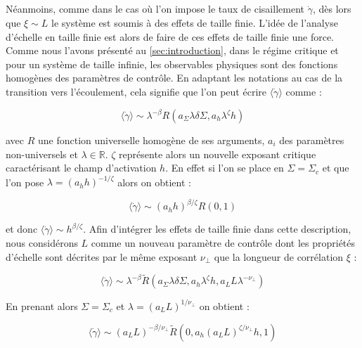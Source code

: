 \subparagraph{}Néanmoins, comme dans le cas où l'on impose le taux de cisaillement $\dot{\gamma}$, dès lors que $\xi \sim L$ le système est soumis à des effets de taille finie. L'idée de l'analyse d'échelle en taille finie est alors de faire de ces effets de taille finie une force. Comme nous l'avons présenté au \autoref{sec:introduction}, dans le régime critique et pour un système de taille infinie, les observables physiques sont des fonctions homogènes des paramètres de contrôle. En adaptant les notations au cas de la transition vers l'écoulement, cela signifie que l'on peut écrire $ \langle \dot{\gamma} \rangle$ comme :

\begin{equation}
\langle\dot{\gamma}\rangle \sim \lambda^{-\beta}R(a_\Sigma\lambda\delta\Sigma, a_h\lambda^\zeta h)
\end{equation}

\noindent avec $R$ une fonction universelle homogène de ses arguments, $a_i$ des paramètres non-universels et $\lambda \in \mathbb{R}$. $\zeta$ représente alors un nouvelle exposant critique caractérisant le champ d'activation $h$. En effet si l'on se place en $\Sigma = \Sigma_c$ et que l'on pose $\lambda=(a_h h)^{-1/\zeta}$ alors on obtient :

\begin{equation}
    \langle\dot{\gamma}\rangle \sim (a_h h)^{\beta/\zeta}R(0, 1)
\end{equation}

\noindent et donc $\langle\dot{\gamma}\rangle \sim  h^{\beta/\zeta}$. Afin d'intégrer les effets de taille finie dans cette description, nous considérons $L$ comme un nouveau paramètre de contrôle dont les propriétés d'échelle sont décrites par le même exposant $\nu_\perp$ que la longueur de corrélation $\xi$ :

\begin{equation}
    \langle\dot{\gamma}\rangle \sim \lambda^{-\beta}\tilde{R}(a_\Sigma \lambda\delta\Sigma,a_h\lambda^\zeta h, a_L L \lambda^{-\nu_\perp})
\end{equation}

\noindent En prenant alors $\Sigma=\Sigma_c$ et $\lambda=(a_LL)^{1/\nu_\perp}$ on obtient :

\begin{equation}
    \langle\dot{\gamma}\rangle \sim (a_LL)^{-\beta/\nu_\perp}\tilde{R}(0, a_h(a_LL)^{\zeta/\nu_\perp} h, 1)
\end{equation}

